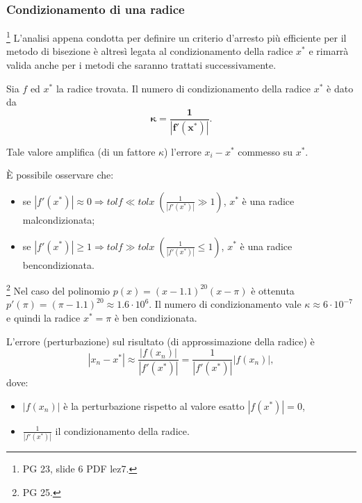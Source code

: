 \subsubsection{Condizionamento di una radice}\footnote{PG 23, slide 6 PDF lez7.} L'analisi appena condotta per definire un criterio d'arresto più efficiente per il metodo di bisezione è altresì legata al condizionamento della radice $x^*$ e rimarrà valida anche per i metodi che saranno trattati successivamente.

\begin{definition}\label{def:numero_condizionamento_radice}
	Sia $f$ ed $x^*$ la radice trovata. Il numero di condizionamento della radice $x^*$ è dato da
	\begin{equation}\label{eq:defK}
		\boldsymbol{\kappa =\frac{1}{|f'(x^*)|}.}
	\end{equation}
\end{definition}
Tale valore amplifica (di un fattore $\kappa$) l'errore $x_i-x^*$ commesso su $x^*$.

\begin{remark}
	È possibile osservare che:
	\begin{itemize}
		\item se $|f'(x^*)|\approx 0\Rightarrow tolf\ll tolx\; \left(\frac{1}{|f'(x^*)|}\gg 1\right)$, $x^*$ è una radice malcondizionata;
		
		\item se $|f'(x^*)|\geq 1 \Rightarrow tolf\gg tolx\; \left(\frac{1}{|f'(x^*)|}\leq 1\right)$, $x^*$ è una radice bencondizionata.
	\end{itemize}
\end{remark}

\begin{example}\footnote{PG 25.}
	Nel caso del polinomio $p(x)=(x-1.1)^{20}(x-\pi)$ è ottenuta $p'(\pi)=(\pi-1.1)^{20}\approx 1.6\cdot 10^6$. Il numero di condizionamento vale $\kappa\approx 6\cdot 10^{-7}$ e quindi la radice $x^*=\pi$ è ben condizionata.
\end{example}

\begin{definition}
	L'errore (perturbazione) sul risultato (di approssimazione della radice) è
	\begin{equation*}
		|x_n-x^*|\approx\frac{|f(x_n)|}{|f'(x^*)|}=\frac{1}{|f'(x^*)|}|f(x_n)|,
	\end{equation*}
	dove:
	\begin{itemize}
		\item $|f(x_n)|$ è la perturbazione rispetto al valore esatto $|f(x^*)|=0$,
		\item  $\frac{1}{|f'(x^*)|}$ il condizionamento della radice.
	\end{itemize}
\end{definition}

